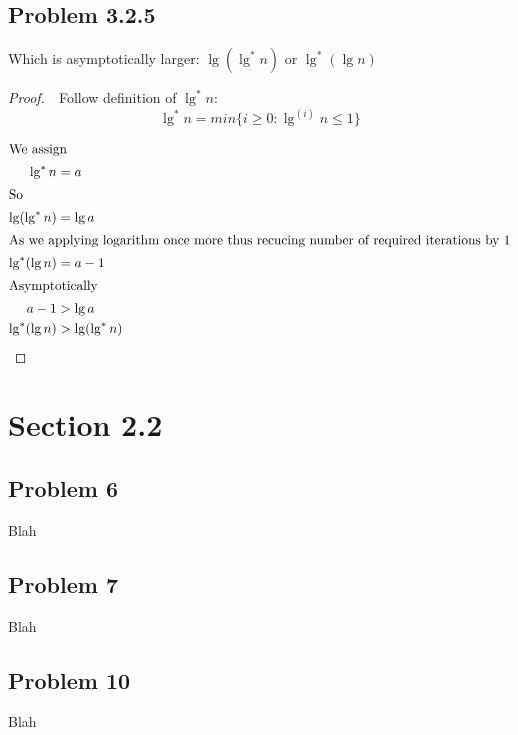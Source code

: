 \documentclass{article}
\begin{document}
\subsection*{Problem 3.2.5}
Which is asymptotically larger: $ \lg(\lg^*n) $ or $ \lg^*(\lg n) $ 
\begin{proof}
    $ $\newline
    $ $\newline
    Follow definition of $ \lg^*n $:
    \begin{equation}
        \lg^*n = min \{i \geq 0: \lg^{(i)} n \leq 1 \}
    \end{equation}
    
    \begin{align*}
        \intertext{We assign} \lg^*n & = a \\
        \intertext{So} \lg(\lg^* n) & = \lg a \\
        \intertext{As we applying logarithm once more thus recucing number of required iterations by 1} \lg^*(\lg n) & = a - 1 \\
        \intertext{Asymptotically} a - 1 & > \lg a \\
        \lg^*(\lg n) & > \lg(\lg^* n) \\
    \end{align*}
\end{proof}

\section*{Section 2.2}
%
\subsection*{Problem 6}
Blah
\subsection*{Problem 7}
Blah
\subsection*{Problem 10}
Blah
\end{document}
